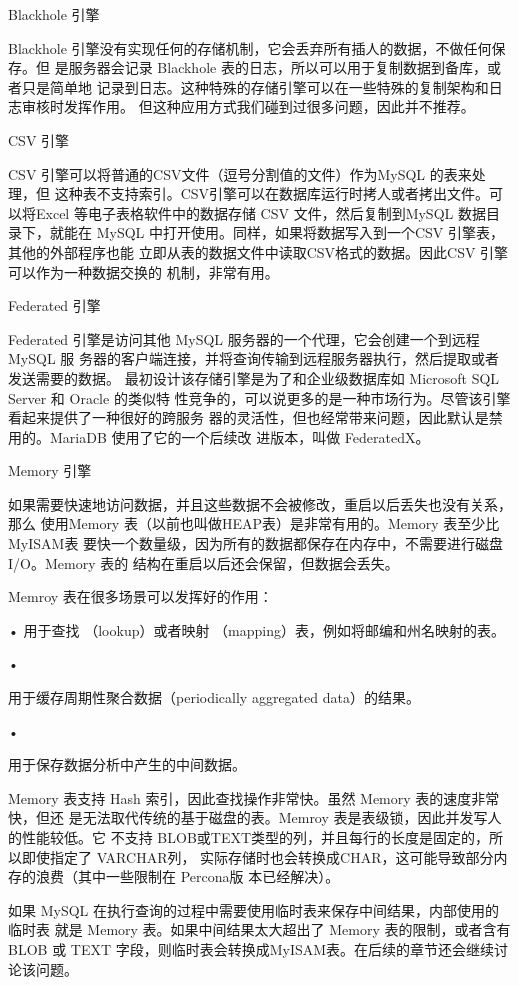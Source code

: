 Blackhole 引擎

Blackhole 引擎没有实现任何的存储机制，它会丢弃所有插人的数据，不做任何保存。但
是服务器会记录 Blackhole 表的日志，所以可以用于复制数据到备库，或者只是简单地
记录到日志。这种特殊的存储引擎可以在一些特殊的复制架构和日志审核时发挥作用。
但这种应用方式我们碰到过很多问题，因此并不推荐。

CSV 引擎

CSV 引擎可以将普通的CSV文件（逗号分割值的文件）作为MySQL 的表来处理，但
这种表不支持索引。CSV引擎可以在数据库运行时拷人或者拷出文件。可以将Excel
等电子表格软件中的数据存储 CSV 文件，然后复制到MySQL 数据目录下，就能在
MySQL 中打开使用。同样，如果将数据写入到一个CSV 引擎表，其他的外部程序也能
立即从表的数据文件中读取CSV格式的数据。因此CSV 引擎可以作为一种数据交换的
机制，非常有用。

Federated 引擎

Federated 引擎是访问其他 MySQL 服务器的一个代理，它会创建一个到远程 MySQL 服
务器的客户端连接，并将查询传输到远程服务器执行，然后提取或者发送需要的数据。
最初设计该存储引擎是为了和企业级数据库如 Microsoft SQL Server 和 Oracle 的类似特
性竞争的，可以说更多的是一种市场行为。尽管该引擎看起来提供了一种很好的跨服务
器的灵活性，但也经常带来问题，因此默认是禁用的。MariaDB 使用了它的一个后续改
进版本，叫做 FederatedX。

Memory 引擎

如果需要快速地访问数据，并且这些数据不会被修改，重启以后丢失也没有关系，那么
使用Memory 表（以前也叫做HEAP表）是非常有用的。Memory 表至少比MyISAM表
要快一个数量级，因为所有的数据都保存在内存中，不需要进行磁盘 I/O。Memory 表的
结构在重启以后还会保留，但数据会丢失。

Memroy 表在很多场景可以发挥好的作用：

• 用于查找 （lookup）或者映射 （mapping）表，例如将邮编和州名映射的表。

•

用于缓存周期性聚合数据（periodically aggregated data）的结果。

•

用于保存数据分析中产生的中间数据。

Memory 表支持 Hash 索引，因此查找操作非常快。虽然 Memory 表的速度非常快，但还
是无法取代传统的基于磁盘的表。Memroy 表是表级锁，因此并发写人的性能较低。它
不支持 BLOB或TEXT类型的列，并且每行的长度是固定的，所以即使指定了 VARCHAR列，
实际存储时也会转换成CHAR，这可能导致部分内存的浪费（其中一些限制在 Percona版
本已经解决）。

如果 MySQL 在执行查询的过程中需要使用临时表来保存中间结果，内部使用的临时表
就是 Memory 表。如果中间结果太大超出了 Memory 表的限制，或者含有 BLOB 或 TEXT
字段，则临时表会转换成MyISAM表。在后续的章节还会继续讨论该问题。

